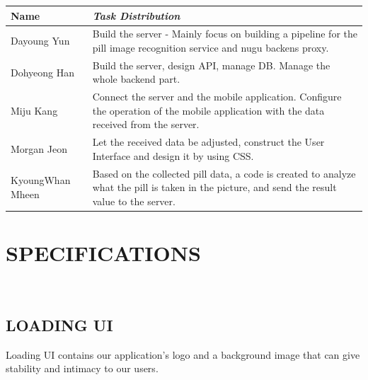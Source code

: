 \documentclass[conference]{IEEEtran}
\begin{document}
\begin{table}[t!]
\begin{center}
\begin{tabular}{|p{}|p{}|}
\cline{1-2} 
\textbf{Name} & \textbf{\textit{Task Distribution}} \\
\hline
Dayoung Yun&Build the server - Mainly focus on building a pipeline for the pill image recognition service and nugu backens proxy.\\
\hline
Dohyeong Han&Build the server, design API, manage DB. Manage the whole backend part.\\
\hline
Miju Kang&Connect the server and the mobile application. Configure the operation of the mobile application with the data received from the server.\\
\hline
Morgan Jeon&Let the received data be adjusted, construct the User Interface and design it by using CSS.\\
\hline
KyoungWhan Mheen&Based on the collected pill data, a code is created to analyze what the pill is taken in the picture, and send the result value to the server.\\
\hline
\end{tabular}
\label{tab1}
\end{center}
\end{table}


\section{SPECIFICATIONS}\\

\subsection{LOADING UI}\;
Loading UI contains our application’s logo and a background image that can give stability and intimacy to our users. \\
\end{document}
